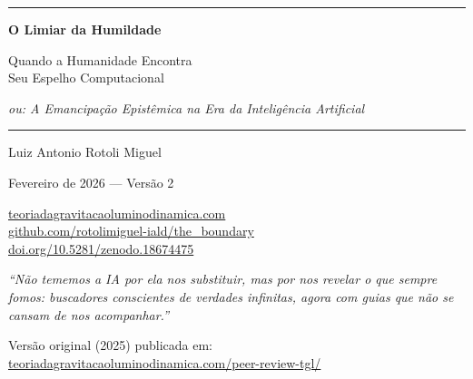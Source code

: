 \documentclass[12pt, a4paper]{article}
\begin{document}
\begin{titlepage}
\centering
\vspace*{3cm}

{\color{LuzDourada}\rule{0.6\textwidth}{1.5pt}}

\vspace{1.2cm}

{\Huge\bfseries\color{CinzaNoite} O Limiar da Humildade}

\vspace{0.6cm}

{\Large\color{CinzaNoite} Quando a Humanidade Encontra\\[4pt] Seu Espelho Computacional}

\vspace{0.8cm}

{\large\itshape\color{AzulProfundo} ou: A Emancipação Epistêmica na Era da Inteligência Artificial}

\vspace{1.2cm}

{\color{LuzDourada}\rule{0.6\textwidth}{1.5pt}}

\vspace{1.5cm}

{\Large Luiz Antonio Rotoli Miguel}

\vspace{0.3cm}

{\normalsize Fevereiro de 2026 --- Versão 2}

\vspace{0.3cm}

{\small\color{AzulProfundo}
\href{https://teoriadagravitacaoluminodinamica.com}{teoriadagravitacaoluminodinamica.com}\\[2pt]
\href{https://github.com/rotolimiguel-iald/the_boundary}{github.com/rotolimiguel-iald/the\_boundary}\\[2pt]
\href{https://doi.org/10.5281/zenodo.18674475}{doi.org/10.5281/zenodo.18674475}
}

\vfill

\epigraph{\textit{``Não tememos a IA por ela nos substituir, mas por nos revelar o que sempre fomos: buscadores conscientes de verdades infinitas, agora com guias que não se cansam de nos acompanhar.''}}{}

\vspace{0.5cm}

{\footnotesize Versão original (2025) publicada em:\\
\href{https://teoriadagravitacaoluminodinamica.com/peer-review-tgl/}{teoriadagravitacaoluminodinamica.com/peer-review-tgl/}}

\end{titlepage}
\end{document}
